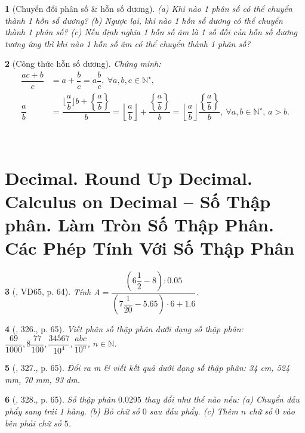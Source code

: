 \documentclass{article}
\newtheorem{baitoan}{}
\begin{document}
\begin{baitoan}[Chuyển đổi phân số \& hỗn số dương]
	(a) Khi nào 1 phân số có thể chuyển thành 1 hỗn số dương? (b) Ngược lại, khi nào 1 hỗn số dương có thể chuyển thành 1 phân số? (c) Nếu định nghĩa 1 \emph{hỗn số âm} là 1 số đối của hỗn số dương tương ứng thì khi nào 1 hỗn số âm có thể chuyển thành 1 phân số?
\end{baitoan}

\begin{baitoan}[Công thức hỗn số dương]
	Chứng minh:
	\begin{align*}
		\dfrac{ac + b}{c} &= a + \dfrac{b}{c} = a\dfrac{b}{c},\ \forall a,b,c\in\mathbb{N}^\star,\\
		\dfrac{a}{b} &= \dfrac{\lfloor\dfrac{a}{b}\rfloor b + \left\{\dfrac{a}{b}\right\}}{b} = \left\lfloor\dfrac{a}{b}\right\rfloor + \dfrac{\left\{\dfrac{a}{b}\right\}}{b} = \left\lfloor\dfrac{a}{b}\right\rfloor\dfrac{\left\{\dfrac{a}{b}\right\}}{b},\ \forall a,b\in\mathbb{N}^\star,\, a > b.
	\end{align*}
\end{baitoan}\


\section{Decimal. Round Up Decimal. Calculus on Decimal -- Số Thập phân. Làm Tròn Số Thập Phân. Các Phép Tính Với Số Thập Phân}

\begin{baitoan}[\cite{Tuyen_Toan_6}, VD65, p. 64]
	Tính $A = \dfrac{\left(6\dfrac{1}{2} - 8\right):0.05}{\left(7\dfrac{1}{20} - 5.65\right)\cdot6 + 1.6}$.
\end{baitoan}

\begin{baitoan}[\cite{Tuyen_Toan_6}, 326., p. 65]
	Viết phân số thập phân dưới dạng số thập phân: $\dfrac{69}{1000},8\dfrac{77}{100},\dfrac{34567}{10^4},\dfrac{abc}{10^n}$, $n\in\mathbb{N}$.
\end{baitoan}

\begin{baitoan}[\cite{Tuyen_Toan_6}, 327., p. 65]
	Đổi ra {\rm m} \& viết kết quả dưới dạng số thập phân: {\rm34 cm, 524 mm, 70 mm, 93 dm}.
\end{baitoan}

\begin{baitoan}[\cite{Tuyen_Toan_6}, 328., p. 65]
	Số thập phân $0.0295$ thay đổi như thế nào nếu: (a) Chuyển dấu phẩy sang trái 1 hàng. (b) Bỏ chữ số $0$ sau dấu phẩy. (c) Thêm $n$ chữ số $0$ vào bên phải chữ số $5$.
\end{baitoan}
\end{document}
